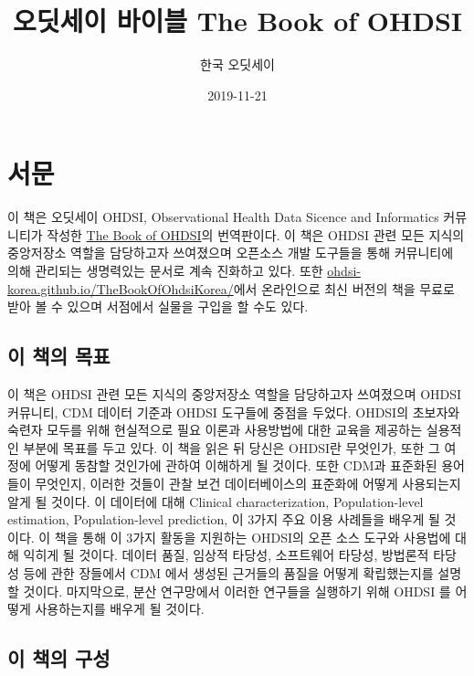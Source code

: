 \documentclass[11pt]{book}
\title{오딧세이 바이블 The Book of OHDSI}
\author{한국 오딧세이}
\date{2019-11-21}
\theoremstyle{definition}
\theoremstyle{definition}
\theoremstyle{definition}
\theoremstyle{remark}
\begin{document}
\maketitle

{
\setcounter{tocdepth}{1}
\tableofcontents
}
\chapter*{서문}

 이 책은 오딧세이 OHDSI, Observational Health Data Sicence and
Informatics 커뮤니티가 작성한 \href{book.ohdsi.org}{The Book of OHDSI}의
번역판이다. 이 책은 OHDSI 관련 모든 지식의 중앙저장소 역할을 담당하고자
쓰여졌으며 오픈소스 개발 도구들을 통해 커뮤니티에 의해 관리되는
생명력있는 문서로 계속 진화하고 있다. 또한
\href{https://ohdsi-korea.github.io/TheBookOfOhdsiKorea/}{ohdsi-korea.github.io/TheBookOfOhdsiKorea/}에서
온라인으로 최신 버전의 책을 무료로 받아 볼 수 있으며 서점에서 실물을
구입을 할 수도 있다.

\section*{이 책의 목표}\label{--}

이 책은 OHDSI 관련 모든 지식의 중앙저장소 역할을 담당하고자 쓰여졌으며
OHDSI 커뮤니티, CDM 데이터 기준과 OHDSI 도구들에 중점을 두었다. OHDSI의
초보자와 숙련자 모두를 위해 현실적으로 필요 이론과 사용방법에 대한
교육을 제공하는 실용적인 부분에 목표를 두고 있다. 이 책을 읽은 뒤 당신은
OHDSI란 무엇인가, 또한 그 여정에 어떻게 동참할 것인가에 관하여 이해하게
될 것이다. 또한 CDM과 표준화된 용어들이 무엇인지, 이러한 것들이 관찰
보건 데이터베이스의 표준화에 어떻게 사용되는지 알게 될 것이다. 이
데이터에 대해 Clinical characterization, Population-level estimation,
Population-level prediction, 이 3가지 주요 이용 사례들을 배우게 될
것이다. 이 책을 통해 이 3가지 활동을 지원하는 OHDSI의 오픈 소스 도구와
사용법에 대해 익히게 될 것이다. 데이터 품질, 임상적 타당성, 소프트웨어
타당성, 방법론적 타당성 등에 관한 장들에서 CDM 에서 생성된 근거들의
품질을 어떻게 확립했는지를 설명할 것이다. 마지막으로, 분산 연구망에서
이러한 연구들을 실행하기 위해 OHDSI 를 어떻게 사용하는지를 배우게 될
것이다.

\section*{이 책의 구성}\label{--}
\end{document}
